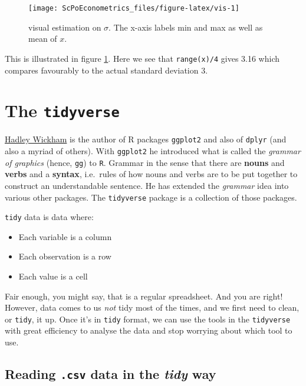 \documentclass[]{book}
\providecommand{\tightlist}{%
  \setlength{\itemsep}{0pt}\setlength{\parskip}{0pt}}
\begin{document}
\begin{figure}

{\centering \texttt{[image: ScPoEconometrics\_files/figure-latex/vis-1]} 

}

\caption{visual estimation on $\sigma$. The x-axis labels min and max as well as mean of $x$.}\label{fig:vis}
\end{figure}

This is illustrated in figure \ref{fig:vis}. Here we see that
\texttt{range(x)/4} gives 3.16 which compares favourably to the actual
standard deviation 3.

\section{\texorpdfstring{The
\texttt{tidyverse}}{The tidyverse}}\label{the-tidyverse}

\href{http://hadley.nz}{Hadley Wickham} is the author of R packages
\texttt{ggplot2} and also of \texttt{dplyr} (and also a myriad of
others). With \texttt{ggplot2} he introduced what is called the
\emph{grammar of graphics} (hence, \texttt{gg}) to \texttt{R}. Grammar
in the sense that there are \textbf{nouns} and \textbf{verbs} and a
\textbf{syntax}, i.e.~rules of how nouns and verbs are to be put
together to construct an understandable sentence. He has extended the
\emph{grammar} idea into various other packages. The \texttt{tidyverse}
package is a collection of those packages.

\texttt{tidy} data is data where:

\begin{itemize}
\tightlist
\item
  Each variable is a column
\item
  Each observation is a row
\item
  Each value is a cell
\end{itemize}

Fair enough, you might say, that is a regular spreadsheet. And you are
right! However, data comes to us \emph{not} tidy most of the times, and
we first need to clean, or \texttt{tidy}, it up. Once it's in
\texttt{tidy} format, we can use the tools in the \texttt{tidyverse}
with great efficiency to analyse the data and stop worrying about which
tool to use.

\subsection{\texorpdfstring{Reading \texttt{.csv} data in the
\emph{tidy}
way}{Reading .csv data in the tidy way}}\label{reading-.csv-data-in-the-tidy-way}
\end{document}
